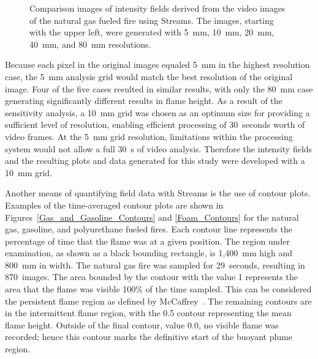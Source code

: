 \documentclass[twoside]{uocthesis}
\begin{document}
{\begin{figure}[p]
	 \caption[Comparison images of intensity fields derived from the video images of the natural gas fueled fire]{Comparison images of intensity fields derived from the video images of the natural gas fueled fire using Streams. The images, starting with the upper left, were generated with 5~mm, 10~mm, 20~mm, 40~mm, and 80~mm resolutions.}
	 \label{Intensity}
\end{figure}

Because each pixel in the original images equaled 5~mm in the highest resolution case, the 5~mm analysis grid would match the best resolution of the original image.  Four of the five cases resulted in similar results, with only the 80~mm case generating significantly different results in flame height.  As a result of the sensitivity analysis, a 10~mm grid was chosen as an optimum size for providing a sufficient level of resolution, enabling efficient processing of 30~seconds worth of video frames.  At the 5~mm grid resolution, limitations within the processing system would not allow a full 30~s of video analysis.  Therefore the intensity fields and the resulting plots and data generated for this study were developed with a 10~mm grid.

Another means of quantifying field data with Streams is the use of contour plots.  Examples of the time-averaged contour plots are shown in Figures~\ref{Gas_and_Gasoline_Contours} and \ref{Foam_Contours} for the natural gas, gasoline, and polyurethane fueled fires.  Each contour line represents the percentage of time that the flame was at a given position. The region under examination, as shown as a black bounding rectangle, is 1,400~mm high and 800~mm in width.  The natural gas fire was sampled for 29~seconds, resulting in 870~images. The area bounded by the contour with the value 1 represents the area that the flame was visible 100\% of the time sampled. This can be considered the persistent flame region as defined by McCaffrey~\cite{McCaffrey:1979}. The remaining contours are in the intermittent flame region, with the 0.5 contour representing the mean flame height. Outside of the final contour, value 0.0, no visible flame was recorded; hence this contour marks the definitive start of the buoyant plume region.

}
\end{document}
